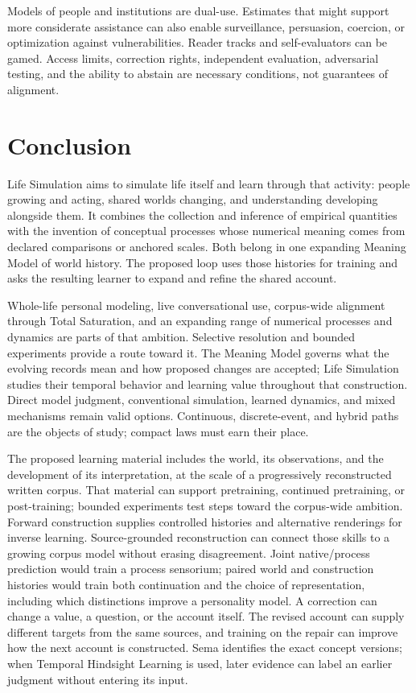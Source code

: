 \documentclass[10pt]{article}
\begin{document}
Models of people and institutions are dual-use. Estimates that might support
more considerate assistance can also enable surveillance, persuasion, coercion, or
optimization against vulnerabilities. Reader tracks and self-evaluators can be
gamed. Access limits, correction rights, independent evaluation, adversarial
testing, and the ability to abstain are necessary conditions, not guarantees of
alignment.

\section{Conclusion}
\label{sec:conclusion}

Life Simulation aims to simulate life itself and learn through that activity:
people growing and acting, shared worlds changing, and understanding developing
alongside them. It combines the collection and inference of empirical
quantities with the invention of conceptual processes whose numerical meaning
comes from declared comparisons or anchored scales. Both belong in one expanding Meaning Model
of world history. The proposed loop uses those histories for training and
asks the resulting learner to expand and refine the shared account.

Whole-life personal modeling, live conversational use,
corpus-wide alignment through Total Saturation, and an expanding range of
numerical processes and dynamics are parts of that ambition. Selective
resolution and bounded experiments provide a route toward it.
The Meaning Model governs what
the evolving records mean and how proposed changes are accepted; Life
Simulation studies their temporal behavior and learning value throughout that
construction. Direct model judgment, conventional simulation, learned dynamics,
and mixed mechanisms remain valid options. Continuous, discrete-event, and
hybrid paths are the objects of study; compact laws must earn their place.

The proposed learning material includes the world, its observations, and the
development of its interpretation, at the scale of a progressively reconstructed
written corpus. That material can support pretraining, continued pretraining,
or post-training; bounded experiments test steps toward the corpus-wide
ambition. Forward construction supplies controlled
histories and alternative renderings for inverse learning. Source-grounded
reconstruction can connect those skills to a growing corpus model without
erasing disagreement. Joint native/process prediction would train a process
sensorium; paired world and construction histories would train both continuation and
the choice of representation, including which distinctions improve a
personality model. A correction can change a value, a question, or the account
itself. The revised account can supply different targets from the same sources,
and training on the repair can improve how the next account is constructed.
Sema identifies the exact concept versions; when Temporal Hindsight Learning
is used, later evidence can label an earlier judgment without entering its input.
\end{document}
